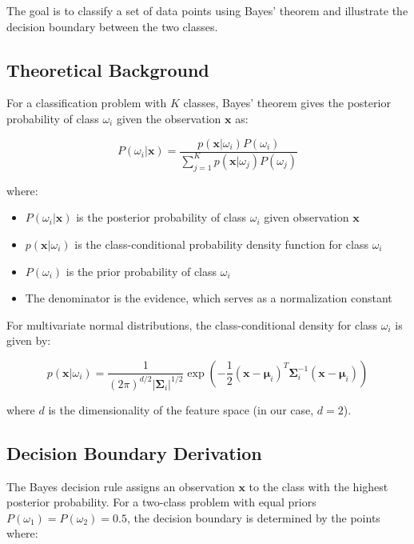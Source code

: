 \documentclass[12pt]{article}
\begin{document}
The goal is to classify a set of data points using Bayes' theorem and illustrate the decision boundary between the two classes.

\subsection{Theoretical Background}
For a classification problem with $K$ classes, Bayes' theorem gives the posterior probability of class $\omega_i$ given the observation $\mathbf{x}$ as:

\begin{equation}
P(\omega_i | \mathbf{x}) = \frac{p(\mathbf{x} | \omega_i) P(\omega_i)}{\sum_{j=1}^{K} p(\mathbf{x} | \omega_j) P(\omega_j)}
\end{equation}

where:
\begin{itemize}
    \item $P(\omega_i | \mathbf{x})$ is the posterior probability of class $\omega_i$ given observation $\mathbf{x}$
    \item $p(\mathbf{x} | \omega_i)$ is the class-conditional probability density function for class $\omega_i$
    \item $P(\omega_i)$ is the prior probability of class $\omega_i$
    \item The denominator is the evidence, which serves as a normalization constant
\end{itemize}

For multivariate normal distributions, the class-conditional density for class $\omega_i$ is given by:

\begin{equation}
p(\mathbf{x} | \omega_i) = \frac{1}{(2\pi)^{d/2}|\boldsymbol{\Sigma}_i|^{1/2}} \exp\left(-\frac{1}{2}(\mathbf{x} - \boldsymbol{\mu}_i)^T \boldsymbol{\Sigma}_i^{-1} (\mathbf{x} - \boldsymbol{\mu}_i)\right)
\end{equation}

where $d$ is the dimensionality of the feature space (in our case, $d=2$).

\subsection{Decision Boundary Derivation}
The Bayes decision rule assigns an observation $\mathbf{x}$ to the class with the highest posterior probability. For a two-class problem with equal priors $P(\omega_1) = P(\omega_2) = 0.5$, the decision boundary is determined by the points where:
\end{document}
